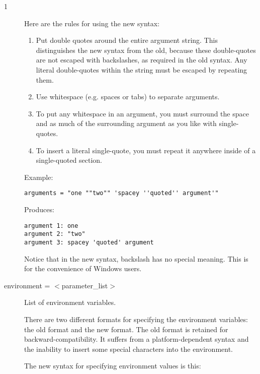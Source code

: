 \begin{ManPage}{\label{man-condor-submit}}{1}
\begin{description}
Here are the rules for using the new syntax:

\begin{enumerate}

\item Put double quotes around the entire argument string.  This
distinguishes the new syntax from the old, because these double-quotes
are not escaped with backslashes, as required in the old syntax.  Any
literal double-quotes within the string must be escaped by repeating
them.

\item Use whitespace (e.g. spaces or tabs) to separate arguments.

\item To put any whitespace in an argument, you must surround the
space and as much of the surrounding argument as you like with
single-quotes.

\item To insert a literal single-quote, you must repeat it anywhere
inside of a single-quoted section.

\end{enumerate}

Example:

\begin{verbatim}
arguments = "one ""two"" 'spacey ''quoted'' argument'"
\end{verbatim}

Produces:

\begin{verbatim}
argument 1: one
argument 2: "two"
argument 3: spacey 'quoted' argument
\end{verbatim}

Notice that in the new syntax, backslash has no special meaning.  This
is for the convenience of Windows users.


\item[environment = $<$parameter\_list$>$] List of environment
\label{man-condor-submit-environment}
variables.

There are two different formats for specifying the environment
variables: the old format and the new format.  The old format is
retained for backward-compatibility.  It suffers from a
platform-dependent syntax and the inability to insert some special
characters into the environment.

The new syntax for specifying environment values is this:


\end{description}
\end{ManPage}
